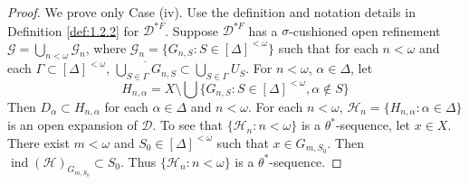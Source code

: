 \documentclass[prelim.tex]{subfiles}
\begin{document}
\begin{proof} 
We prove only Case (iv). Use the definition and notation details in 
Definition \ref{def:1.2.2} for $\mathscr{D}^{*F}$. 
Suppose $\mathscr{D}^{*F}$  has a
$\sigma$-cushioned open refinement
$\mathscr{G} = \bigcup_{n<\omega} \mathscr{G}_{n}$, where 
$\mathscr{G}_{n} = \{G_{n, S}: S\in [\Delta]^{<\omega}\}$ 
such that for each $n<\omega$ and each $\Gamma\subset [\Delta]^{<\omega}$,  
$\overline{\bigcup_{S\in\Gamma} G_{n,S}} \subset \bigcup_{S\in\Gamma} U_S$. For $n<\omega$, $\alpha\in \Delta$, let
$$H_{n,\alpha} = X \setminus \bigcup \{G_{n,S}: 
S\in [\Delta]^{<\omega}, \alpha\notin S\}$$
Then $D_\alpha \subset H_{n,\alpha}$ for each $\alpha \in \Delta$ and $n<\omega$. 
For each $n<\omega$, $\mathscr{H}_{n} = \{H_{n,\alpha}: \alpha \in \Delta\}$ 
is an open expansion of $\mathscr{D}$. 
To see that $\{\mathscr{H}_n: n<\omega\}$ is a $\theta^*$-sequence, let $x \in X$. 
There exist $m<\omega$ and $S_0 \in [\Delta]^{<\omega}$ 
such that $x \in G_{m, S_0}$. 
Then $\operatorname{ind} (\mathscr{H})_{G_{m,S_0}}\subset S_0$. 
Thus $\{\mathscr{H}_n: n<\omega\}$ is a $\theta^*$-sequence.
\end{proof} 
\end{document}
